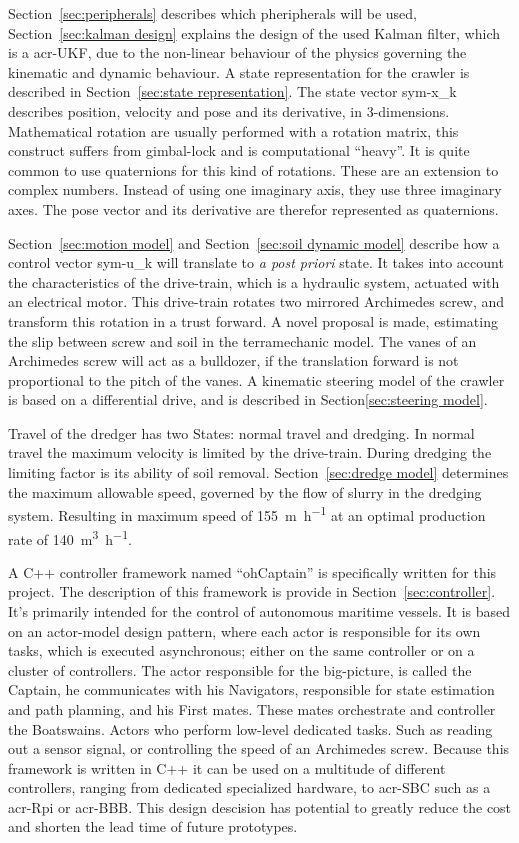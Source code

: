 Section~\ref{sec:peripherals} describes which pheripherals will be used, Section~\ref{sec:kalman design} explains the
design of the used Kalman filter, which is a \gls{acr-UKF}, due to the non-linear behaviour of the physics governing 
the kinematic and dynamic behaviour. A state representation for the crawler is described in Section~\ref{sec:state 
representation}. The state vector \gls{sym-x_k} describes position, velocity and pose and its derivative, in 
3-dimensions. Mathematical rotation are usually performed with a rotation matrix, this construct suffers from 
gimbal-lock and is computational ``heavy''. It is quite common to use quaternions for this kind of rotations. These 
are an extension to complex numbers. Instead of using one imaginary axis, they use three imaginary axes. The pose 
vector and its derivative are therefor represented as quaternions.

Section~\ref{sec:motion model} and Section~\ref{sec:soil dynamic model} describe how a control vector \gls{sym-u_k}
will translate to \textit{a post priori} state. It takes into account the characteristics of the drive-train, which is a
hydraulic system, actuated with an electrical motor. This drive-train rotates two mirrored Archimedes screw, and
transform this rotation in a trust forward. A novel proposal is made, estimating the slip between screw and soil in
the terramechanic model. The vanes of an Archimedes screw will act as a bulldozer, if the translation forward
is not proportional to the pitch of the vanes. A kinematic steering model of the crawler is based on a differential
drive, and is described in Section\ref{sec:steering model}.

Travel of the dredger has two States: normal travel and dredging. In normal travel the maximum velocity is limited by
the drive-train. During dredging the limiting factor is its ability of soil removal. Section~\ref{sec:dredge model}
determines the maximum allowable speed, governed by the flow of slurry in the dredging system. Resulting in maximum
speed of \SI{155}{\metre\per\hour} at an optimal production rate of \SI{140}{\cubic\metre\per\hour}.

A C++ controller framework named ``ohCaptain'' is specifically written for this project. The description of this
framework is provide in Section~\ref{sec:controller}. It's primarily intended for the control of autonomous maritime 
vessels. It is based on an actor-model design pattern, where each actor is responsible for its own
tasks, which is executed asynchronous; either on the same controller or on a cluster of controllers. The actor
responsible for the big-picture, is called the Captain, he communicates with his Navigators, responsible for state
estimation and path planning, and his First mates. These mates orchestrate and controller the Boatswains.
Actors who perform low-level dedicated tasks. Such as reading out a sensor signal, or controlling
the speed of an Archimedes screw. Because this framework is written in C++ it can be used on a multitude of different
controllers, ranging from dedicated specialized hardware, to \gls{acr-SBC} such as a \gls{acr-Rpi} or \gls{acr-BBB}.
This design descision has potential to greatly reduce the cost and shorten the lead time of future prototypes.

